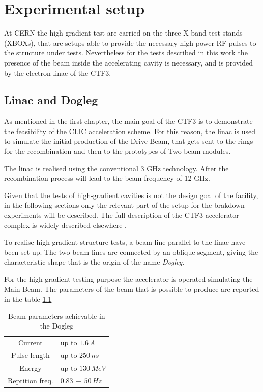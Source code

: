 \chapter[Experimental setup]{Experimental setup}

At CERN the high-gradient test are carried on the three X-band test stands (XBOXs), that are setups able to provide the necessary high power RF pulses to the structure under tests. Nevertheless for the tests described in this work the presence of the beam inside the accelerating cavity is necessary, and is provided by the electron linac of the CTF3. 


\section[Linac and dogleg]{Linac and Dogleg}

As mentioned in the first chapter, the main goal of the CTF3 is to demonstrate the feasibility of the CLIC acceleration scheme. For this reason, the linac is used to simulate the initial production of the Drive Beam, that gets sent to the rings for the recombination and then to the prototypes of Two-beam modules. 

The linac is realised using the conventional 3 GHz technology. After the recombination process will lead to the beam frequency of 12 GHz. 

Given that the tests of high-gradient cavities is not the design goal of the facility, in the following sections only the relevant part of the setup for the brakdown experiments will be described. The full description of the CTF3 accelerator complex is widely described elsewhere \cite{CLIC:cdr,CTF:drive_beam,ctf3:dr}. 

To realise high-gradient structure tests, a beam line parallel to the linac have been set up. The two beam lines are connected by an oblique segment, giving the characteristic shape that is the origin of the name \textit{Dogleg}.

For the high-gradient testing purpose the accelerator is operated simulating the Main Beam. The parameters of the beam that is possible to produce are reported in the table \ref{beam_par_dogleg}


\begin{table}
  \centering
    \begin{tabular}{ c l }
    \hline
    \hline
    Current 		&	up to $1.6\,A$\\
    Pulse length		&	up to $250\,ns$\\
    Energy			&	up to $130\, MeV$\\
    Reptition freq.	&	$0.83\,-\,50\, Hz$\\
    \hline
    \hline
    \end{tabular}
\caption{Beam parameters achievable in the Dogleg \cite{NavarroQuirante:2025954}}
\label{beam_par_dogleg}
\end{table}



